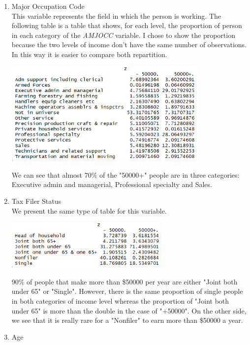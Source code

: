 \documentclass{article}
\begin{document}
\newpage
\begin{enumerate}
    \item Major Occupation Code\\
    
This variable represents the field in which the person is working. The following table is a table that shows, for each level, the proportion of person in each category of the \textit{AMJOCC} variable. I chose to show the proportion because the two levels of income don't have the same number of observations. In this way it is easier to compare both repartition.
\begin{center}
\includegraphics[width=10cm]{AMJOCC_table.png}
\end{center}
We can see that almost 70\% of the "50000+" people are in three categories: Executive admin and managerial, Professional specialty and Sales. 

    \item Tax Filer Status\\

We present the same type of table for this variable.
\begin{center}
\includegraphics[width=8cm]{FILESTAT_table.png}
\end{center}
90\% of people that make more than \$50000 per year are either "Joint both under 65" or "Single". However, there is the same proportion of single people in both categories of income level whereas the proportion of "Joint both under 65" is more than the double in the case of "+50000". On the other side, we see that it is really rare for a "Nonfiler" to earn more than \$50000 a year.

    \item Age\\
    

\end{enumerate}
\end{document}
